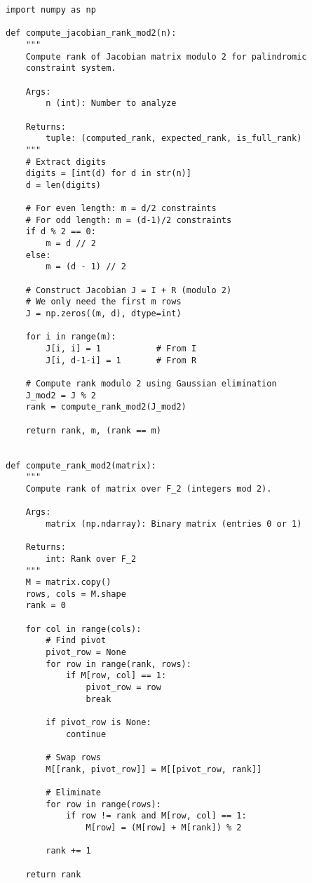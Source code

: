 \documentclass[11pt,a4paper]{article}
\begin{document}
\begin{lstlisting}[style=pythonstyle, caption={Jacobian Rank Verification}]
import numpy as np

def compute_jacobian_rank_mod2(n):
    """
    Compute rank of Jacobian matrix modulo 2 for palindromic 
    constraint system.
    
    Args:
        n (int): Number to analyze
        
    Returns:
        tuple: (computed_rank, expected_rank, is_full_rank)
    """
    # Extract digits
    digits = [int(d) for d in str(n)]
    d = len(digits)
    
    # For even length: m = d/2 constraints
    # For odd length: m = (d-1)/2 constraints
    if d % 2 == 0:
        m = d // 2
    else:
        m = (d - 1) // 2
    
    # Construct Jacobian J = I + R (modulo 2)
    # We only need the first m rows
    J = np.zeros((m, d), dtype=int)
    
    for i in range(m):
        J[i, i] = 1           # From I
        J[i, d-1-i] = 1       # From R
    
    # Compute rank modulo 2 using Gaussian elimination
    J_mod2 = J % 2
    rank = compute_rank_mod2(J_mod2)
    
    return rank, m, (rank == m)


def compute_rank_mod2(matrix):
    """
    Compute rank of matrix over F_2 (integers mod 2).
    
    Args:
        matrix (np.ndarray): Binary matrix (entries 0 or 1)
        
    Returns:
        int: Rank over F_2
    """
    M = matrix.copy()
    rows, cols = M.shape
    rank = 0
    
    for col in range(cols):
        # Find pivot
        pivot_row = None
        for row in range(rank, rows):
            if M[row, col] == 1:
                pivot_row = row
                break
        
        if pivot_row is None:
            continue
        
        # Swap rows
        M[[rank, pivot_row]] = M[[pivot_row, rank]]
        
        # Eliminate
        for row in range(rows):
            if row != rank and M[row, col] == 1:
                M[row] = (M[row] + M[rank]) % 2
        
        rank += 1
    
    return rank
\end{lstlisting}
\end{document}

